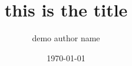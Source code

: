 
\title{this is the title}
\author{demo author name}
\date{\today}
\newcommand{\institution}{Kunstuniversität Linz}
\newcommand{\department}{Tangible Music Lab}
\newcommand{\thetitle}{this is the title}
\newcommand{\subtitle}{this is the subtitle}
\newcommand{\theauthor}{demo author name}
\newcommand{\degree}{Master of Arts}
\newcommand{\supervisor}{this is the supervisor}
\newcommand{\submissiondate}{October, 2025}


\thispagestyle{empty}
\newpage